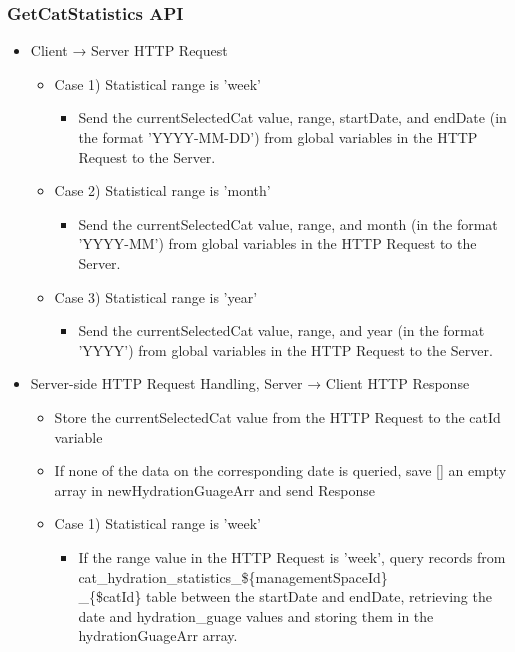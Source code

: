 \documentclass[conference]{IEEEtran}
\begin{document}
\subsubsection{GetCatStatistics API}
\begin{itemize}
    \item Client → Server HTTP Request
    \begin{itemize}
        \item Case 1) Statistical range is 'week' 
        \begin{itemize}
            \item Send the currentSelectedCat value, range, startDate, and endDate (in the format 'YYYY-MM-DD') from global variables in the HTTP Request to the Server.
        \end{itemize}
        \item Case 2) Statistical range is 'month' 
        \begin{itemize}
            \item Send the currentSelectedCat value, range, and month (in the format 'YYYY-MM') from global variables in the HTTP Request to the Server.
        \end{itemize}
        \item Case 3) Statistical range is 'year' 
        \begin{itemize}
            \item Send the currentSelectedCat value, range, and year (in the format 'YYYY') from global variables in the HTTP Request to the Server.
            \\
        \end{itemize}
    \end{itemize}
    \item Server-side HTTP Request Handling, Server → Client HTTP Response
    \begin{itemize}
        \item Store the currentSelectedCat value from the HTTP Request to the catId variable
        \item If none of the data on the corresponding date is queried, save [] an empty array in newHydrationGuageArr and send Response
        \item Case 1) Statistical range is 'week' 
        \begin{itemize}
            \item If the range value in the HTTP Request is 'week', query records from cat\_hydration\_statistics\_\$\{managementSpaceId\}\\\_\{\$catId\} table between the startDate and endDate, retrieving the date and hydration\_guage values and storing them in the hydrationGuageArr array.

\end{itemize}
\end{itemize}
\end{itemize}
\end{document}
